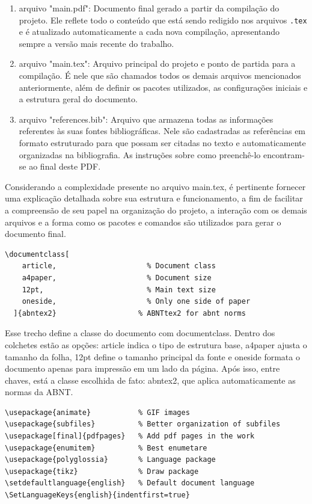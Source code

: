 \begin{enumerate}
\item arquivo "main.pdf": Documento final gerado a partir da compilação do projeto. Ele reflete todo o conteúdo que está sendo redigido nos arquivos \texttt{.tex} e é atualizado automaticamente a cada nova compilação, apresentando sempre a versão mais recente do trabalho.

\item arquivo "main.tex": Arquivo principal do projeto e ponto de partida para a compilação. É nele que são chamados todos os demais arquivos mencionados anteriormente, além de definir os pacotes utilizados, as configurações iniciais e a estrutura geral do documento.

\item arquivo "references.bib": Arquivo que armazena todas as informações referentes às suas fontes bibliográficas. Nele são cadastradas as referências em formato estruturado para que possam ser citadas no texto e automaticamente organizadas na bibliografia. As instruções sobre como preenchê-lo encontram-se ao final deste PDF.

\end{enumerate}

Considerando a complexidade presente no arquivo main.tex, é pertinente fornecer uma explicação detalhada sobre sua estrutura e funcionamento, a fim de facilitar a compreensão de seu papel na organização do projeto, a interação com os demais arquivos e a forma como os pacotes e comandos são utilizados para gerar o documento final.

\begin{lstlisting}[firstnumber=last]
\documentclass[
	article,                     % Document class
	a4paper,                     % Document size
	12pt,                        % Main text size
	oneside,                     % Only one side of paper
  ]{abntex2}                   % ABNTtex2 for abnt norms
\end{lstlisting}

Esse trecho define a classe do documento com documentclass. Dentro dos colchetes estão as opções: article indica o tipo de estrutura base, a4paper ajusta o tamanho da folha, 12pt define o tamanho principal da fonte e oneside formata o documento apenas para impressão em um lado da página. Após isso, entre chaves, está a classe escolhida de fato: abntex2, que aplica automaticamente as normas da ABNT.

\begin{lstlisting}[firstnumber=last]
\usepackage{animate}           % GIF images
\usepackage{subfiles}          % Better organization of subfiles
\usepackage[final]{pdfpages}   % Add pdf pages in the work
\usepackage{enumitem}          % Best enumetare
\usepackage{polyglossia}       % Language package
\usepackage{tikz}              % Draw package
\setdefaultlanguage{english}   % Default document language
\SetLanguageKeys{english}{indentfirst=true}
\end{lstlisting}

